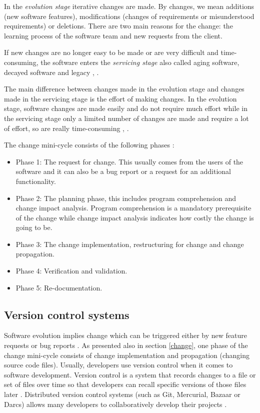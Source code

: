 \documentclass[12pt, a4paper, twoside]{report}
\begin{document}
In the \textit{evolution stage} iterative changes are made. By changes, we mean additions (new software features), modifications (changes of requirements or misunderstood requirements) or deletions. There are two main reasons for the change: the learning process of the software team and new requests from the client.

If new changes are no longer easy to be made or are very difficult and time-consuming, the software enters the \textit{servicing stage} also called aging software, decayed software and legacy \cite{Software-life-cycle}, \cite{363157}.

The main difference between changes made in the evolution stage and changes made in the servicing stage is the effort of making changes. In the evolution stage, software changes are made easily and do not require much effort while in the servicing stage only a limited number of changes are made and require a lot of effort, so are really time-consuming \cite{Bennett}, \cite{Rajlich}.

The change mini-cycle consists of the following phases \cite{810308}:
\begin{itemize}
\item Phase 1: The request for change. This usually comes from the users of the software and it can also be a bug report or a request for an additional functionality. 
\item Phase 2: The planning phase, this includes program comprehension and change impact analysis. Program comprehension is a mandatory prerequisite of the change while change
impact analysis indicates how costly the change is going to be. \cite{Bohner}
\item Phase 3: The change implementation, restructuring for change and change propagation.
\item Phase 4: Verification and validation.
\item Phase 5: Re-documentation.
\end{itemize}


\subsection{Version control systems}

Software evolution implies change which can be triggered either by new feature requests or bug reports \cite{articleEvolution}. As presented also in section \ref{change}, one phase of the change mini-cycle consists of change implementation and propagation (changing source code files). 
Usually, developers use version control when it comes to software development. Version control is a system that records changes to a file or set of files over time so that developers can recall specific versions of those files later \cite{svn}.
Distributed version control systems (such as Git, Mercurial, Bazaar or Darcs) allows many developers to collaboratively develop their projects \cite{7471284}.
\end{document}
